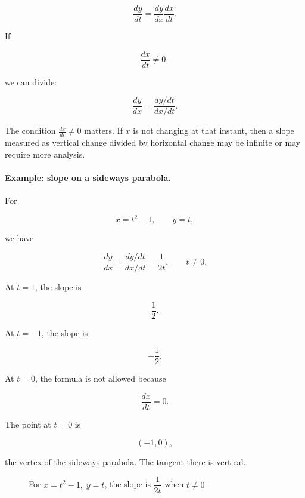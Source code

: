 \[
\frac{dy}{dt}
=
\frac{dy}{dx}\frac{dx}{dt}.
\]

If

\[
\frac{dx}{dt}\neq0,
\]

we can divide:

\[
\frac{dy}{dx}
=
\frac{dy/dt}{dx/dt}.
\]

The condition \(\frac{dx}{dt}\neq0\) matters.  If \(x\) is not changing at that instant,
then a slope measured as vertical change divided by horizontal change may be infinite
or may require more analysis.

\paragraph{Example: slope on a sideways parabola.}
For

\[
x=t^2-1,
\qquad
y=t,
\]

we have

\[
\frac{dy}{dx}
=
\frac{dy/dt}{dx/dt}
=
\frac{1}{2t},
\qquad
t\neq0.
\]

At \(t=1\), the slope is

\[
\frac12.
\]

At \(t=-1\), the slope is

\[
-\frac12.
\]

At \(t=0\), the formula is not allowed because

\[
\frac{dx}{dt}=0.
\]

The point at \(t=0\) is

\[
(-1,0),
\]

the vertex of the sideways parabola.  The tangent there is vertical.

\begin{figure}[h]
\centering
{}
\caption{For \(x=t^2-1,\;y=t\), the slope is \(\dfrac{1}{2t}\) when \(t\neq0\).}
\label{fig:parametric-slope-sideways-parabola}
\end{figure}


